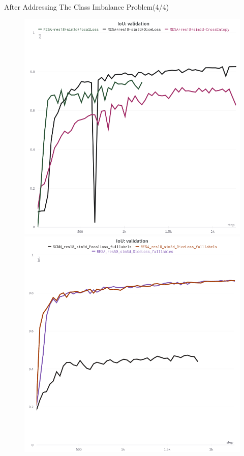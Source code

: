 \documentclass[aspectratio=169]{beamer}
\begin{document}
\begin{frame}{After Addressing The Class Imbalance Problem(4/4)}
\begin{figure}
   \includegraphics[scale=0.2]{images/change2.png}
   \hfill
   \includegraphics[scale=0.2]{images/change1.png}
\end{figure}

\end{frame}
\end{document}
